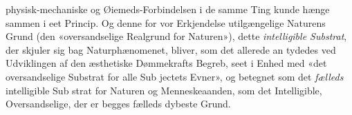 \documentclass[12pt,a4paper]{book}
\begin{document}
physisk-mechaniske og Øiemeds-Forbindelsen i de samme
Ting kunde hænge sammen i eet Princip. Og denne for vor
Erkjendelse utilgængelige Naturens Grund (den «oversandselige
Realgrund for Naturen»), dette \emph{intelligible Substrat}, der
skjuler sig bag Naturphænomenet, bliver, som det allerede an\-%
tydedes ved Udviklingen af den æsthetiske Dømmekrafts Begreb,
seet i Enhed med «det oversandselige Substrat for alle Sub\-%
jectets Evner», og betegnet som det \emph{fælleds} intelligible Sub\-%
strat for Naturen og Menneskeaanden, som det Intelligible,
Oversandselige, der er begges fælleds dybeste Grund.
\end{document}
